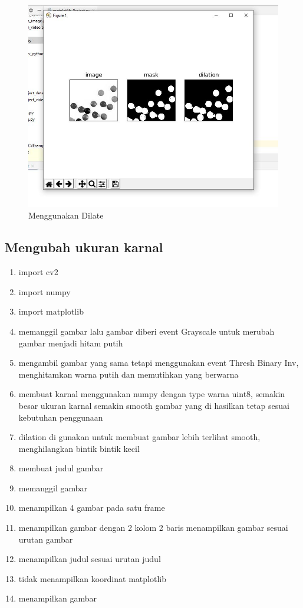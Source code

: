\begin{figure}[ht]
\centering
\includegraphics[scale=0.6]{figures/2,52.jpg}
\caption{Menggunakan Dilate}
\label{contoh}
\end{figure}







\newpage
\subsection{Mengubah ukuran karnal}

\begin{enumerate}
	\item import cv2
	\item import numpy
	\item import matplotlib
	\item memanggil gambar lalu gambar diberi event Grayscale untuk merubah gambar menjadi hitam putih
	\item mengambil gambar yang sama tetapi menggunakan event Thresh Binary Inv, menghitamkan warna putih dan memutihkan yang berwarna
	\item membuat karnal menggunakan numpy dengan type warna uint8, semakin besar ukuran karnal semakin smooth gambar yang di hasilkan tetap sesuai kebutuhan penggunaan
	\item dilation di gunakan untuk membuat gambar lebih terlihat smooth, menghilangkan bintik bintik kecil
	\item membuat judul gambar
	\item memanggil gambar
	\item menampilkan 4 gambar pada satu frame
	\item menampilkan gambar dengan 2 kolom 2 baris menampilkan gambar sesuai urutan gambar
	\item menampilkan judul sesuai urutan judul
	\item tidak menampilkan koordinat matplotlib
	\item menampilkan gambar
\end{enumerate}

